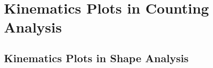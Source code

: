 


\section{Kinematics Plots in Counting Analysis}

\FloatBarrier



\subsection{Kinematics Plots in Shape Analysis}
% 
% 
% 
% 
% 
% 
% 
\FloatBarrier
